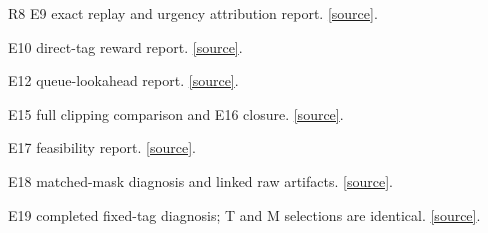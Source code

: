 \begin{thebibliography}{R8}
 E9 exact replay and urgency attribution report. \href{https://github.com/ISAAC558345/waypoint-transformer/blob/26e35e9abcf2d79a7e5d3b932387af8d32d88431/docs/research/HTW_UrgencyAware_Reward_Attribution_Report_CN.md}{[source]}.

 E10 direct-tag reward report. \href{https://github.com/ISAAC558345/waypoint-transformer/blob/26e35e9abcf2d79a7e5d3b932387af8d32d88431/docs/research/HTW_UrgencyAware_Direct_Tag_Reward_Experiment_Report_CN.md}{[source]}.

 E12 queue-lookahead report. \href{https://github.com/ISAAC558345/waypoint-transformer/blob/26e35e9abcf2d79a7e5d3b932387af8d32d88431/docs/research/HTW_UrgencyAware_Queue_Lookahead_Experiment_Report_CN.md}{[source]}.

 E15 full clipping comparison and E16 closure. \href{https://github.com/ISAAC558345/waypoint-transformer/blob/26e35e9abcf2d79a7e5d3b932387af8d32d88431/docs/research/HTW_UrgencyAware_Clip_Group_Benchmark_Report_CN.md}{[source]}.

 E17 feasibility report. \href{https://github.com/ISAAC558345/waypoint-transformer/blob/26e35e9abcf2d79a7e5d3b932387af8d32d88431/docs/research/HTW_UrgencyAware_Assignment_Feasibility_Report_CN.md}{[source]}.

 E18 matched-mask diagnosis and linked raw artifacts. \href{https://github.com/ISAAC558345/waypoint-transformer/blob/26e35e9abcf2d79a7e5d3b932387af8d32d88431/docs/research/HTW_UrgencyAware_Assignment_Coverage_Diagnosis_Report_CN.md}{[source]}.

 E19 completed fixed-tag diagnosis; T and M selections are identical. \href{https://github.com/ISAAC558345/waypoint-transformer/blob/f9e9a9e007d7d84046232181fdab6f9a732a4a05/docs/research/HTW_UrgencyAware_Fixed_Tag_Rule_Diagnosis_Report_CN.md}{[source]}.

\end{thebibliography}
